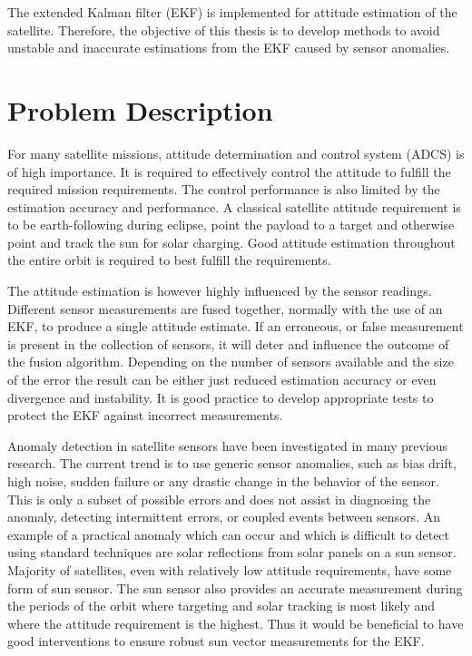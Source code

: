 The extended Kalman filter (EKF) is implemented for attitude estimation of the satellite. Therefore, the objective of this thesis is to develop methods to avoid unstable and inaccurate estimations from the EKF caused by sensor anomalies.

\section{Problem Description}
For many satellite missions, attitude determination and control system (ADCS) is of high importance. It is required to effectively control the attitude to fulfill the required mission requirements.  The control performance is also limited by the estimation accuracy and performance.  A classical satellite attitude requirement is to be earth-following during eclipse, point the payload to a target and otherwise point and track the sun for solar charging. Good attitude estimation throughout the entire orbit is required to best fulfill the requirements.

The attitude estimation is however highly influenced by the sensor readings. Different sensor measurements are fused together, normally with the use of an EKF, to produce a single attitude estimate.  If an erroneous, or false measurement is present in the collection of sensors, it will deter and influence the outcome of the fusion algorithm.  Depending on the number of sensors available and the size of the error the result can be either just reduced estimation accuracy or even divergence and instability. It is good practice to develop appropriate tests to protect the EKF against incorrect measurements. 

Anomaly detection in satellite sensors have been investigated in many previous research.  The current trend is to use generic sensor anomalies, such as bias drift, high noise, sudden failure or any drastic change in the behavior of the sensor. This is only a subset of possible errors and does not assist in diagnosing the anomaly, detecting intermittent errors, or coupled events between sensors. An example of a practical anomaly which can occur and which is difficult to detect using standard techniques are solar reflections from solar panels on a sun sensor. Majority of satellites, even with relatively low attitude requirements, have some form of sun sensor.  The sun sensor also provides an accurate measurement during the periods of the orbit where targeting and solar tracking is most likely and where the attitude requirement is the highest.  Thus it would be beneficial to have good interventions to ensure robust sun vector measurements for the EKF.

